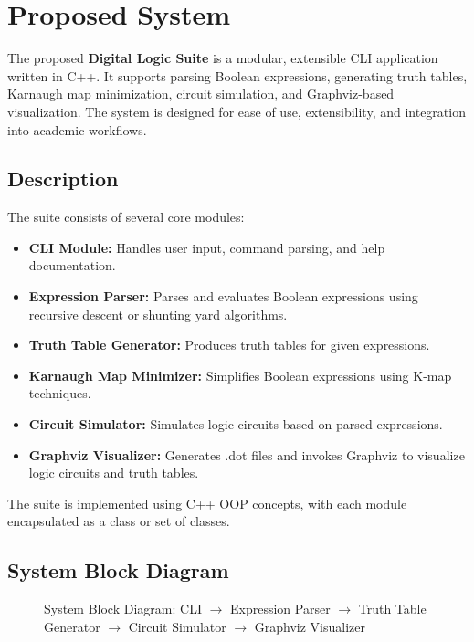 \section{Proposed System}
The proposed \textbf{Digital Logic Suite} is a modular, extensible CLI application written in C++. It supports parsing Boolean expressions, generating truth tables, Karnaugh map minimization, circuit simulation, and Graphviz-based visualization. The system is designed for ease of use, extensibility, and integration into academic workflows.

\vspace{0.5em}

\subsection{Description}
The suite consists of several core modules:
\begin{itemize}
    \item \textbf{CLI Module:} Handles user input, command parsing, and help documentation.
    \item \textbf{Expression Parser:} Parses and evaluates Boolean expressions using recursive descent or shunting yard algorithms.
    \item \textbf{Truth Table Generator:} Produces truth tables for given expressions.
    \item \textbf{Karnaugh Map Minimizer:} Simplifies Boolean expressions using K-map techniques.
    \item \textbf{Circuit Simulator:} Simulates logic circuits based on parsed expressions.
    \item \textbf{Graphviz Visualizer:} Generates .dot files and invokes Graphviz to visualize logic circuits and truth tables.
\end{itemize}
The suite is implemented using C++ OOP concepts, with each module encapsulated as a class or set of classes.

\vspace{0.5em}

\subsection{System Block Diagram}
\begin{figure}[ht!]
    \centering
    \caption{System Block Diagram: CLI $\rightarrow$ Expression Parser $\rightarrow$ Truth Table Generator $\rightarrow$ Circuit Simulator $\rightarrow$ Graphviz Visualizer}
\end{figure}
